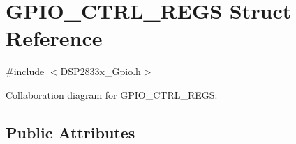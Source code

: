 \hypertarget{struct_g_p_i_o___c_t_r_l___r_e_g_s}{}\section{G\+P\+I\+O\+\_\+\+C\+T\+R\+L\+\_\+\+R\+E\+G\+S Struct Reference}
\label{struct_g_p_i_o___c_t_r_l___r_e_g_s}


{\ttfamily \#include $<$D\+S\+P2833x\+\_\+\+Gpio.\+h$>$}



Collaboration diagram for G\+P\+I\+O\+\_\+\+C\+T\+R\+L\+\_\+\+R\+E\+G\+S\+:
\subsection*{Public Attributes}
